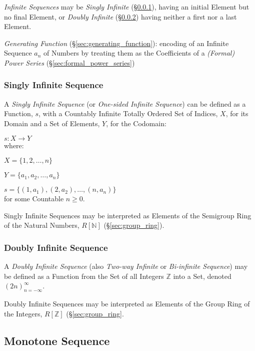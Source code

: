 \emph{Infinite Sequences} may be \emph{Singly Infinite}
(\S\ref{sec:singly_infinite}), having an initial Element but no final
Element, or \emph{Doubly Infinite} (\S\ref{sec:doubly_infinite})
having neither a first nor a last Element.

\fist \emph{Generating Function} (\S\ref{sec:generating_function}): encoding of
an Infinite Sequence $a_n$ of Numbers by treating them as the Coefficients of a
\emph{(Formal) Power Series} (\S\ref{sec:formal_power_series})



\subsubsection{Singly Infinite Sequence}\label{sec:singly_infinite}

A \emph{Singly Infinite Sequence} (or \emph{One-sided Infinite
  Sequence}) can be defined as a Function, $s$, with a Countably
Infinite Totally Ordered Set of Indices, $X$, for its Domain and a Set
of Elements, $Y$, for the Codomain:

  $s : X \rightarrow Y$ \\
where:

  $X = \{1,2,\ldots,n\}$

  $Y = \{a_1, a_2,\ldots,a_n\}$

  $s = \{(1,a_1), (2,a_2),\ldots, (n,a_n)\}$ \\
for some Countable $n \geq 0$.

Singly Infinite Sequences may be interpreted as Elements of the
Semigroup Ring of the Natural Numbers, $R[\mathbb{N}]$
(\S\ref{sec:group_ring}).



\subsubsection{Doubly Infinite Sequence}\label{sec:doubly_infinite}

A \emph{Doubly Infinite Sequence} (also \emph{Two-way Infinite} or
\emph{Bi-infinite Sequence}) may be defined as a Function from the Set
of all Integers $\mathbb{Z}$ into a Set, denoted
$(2n)^{\infty}_{n=-\infty}$.

Doubly Infinite Sequences may be interpreted as Elements of the Group
Ring of the Integers, $R[\mathbb{Z}]$ (\S\ref{sec:group_ring}.



\subsection{Monotone Sequence}\label{sec:monotone_sequence}

